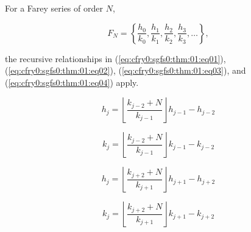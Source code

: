\begin{vworktheoremstatement}
\label{thm:cfry0:sgfs0:01}
For a Farey series of order $N$,

\begin{equation}
F_N = \left\{ { 
\frac{h_0}{k_0},  
\frac{h_1}{k_1},
\frac{h_2}{k_2},
\frac{h_3}{k_3},
\ldots
} \right\} ,
\end{equation}

the recursive relationships in 
(\ref{eq:cfry0:sgfs0:thm:01:eq01}), 
(\ref{eq:cfry0:sgfs0:thm:01:eq02}), 
(\ref{eq:cfry0:sgfs0:thm:01:eq03}), and 
(\ref{eq:cfry0:sgfs0:thm:01:eq04}) apply.

\begin{equation}
\label{eq:cfry0:sgfs0:thm:01:eq01}
h_{j}  = \left\lfloor {\frac{{k_{j-2}
     + N}}{{k_{j - 1} }}} \right\rfloor h_{j - 1}  - h_{j-2}
\end{equation}

\begin{equation}
\label{eq:cfry0:sgfs0:thm:01:eq02}
k_{j}  = \left\lfloor {\frac{{k_{j-2}  + N}}{{k_{j
     - 1} }}} \right\rfloor k_{j - 1}  - k_{j-2}
\end{equation}

\begin{equation}
\label{eq:cfry0:sgfs0:thm:01:eq03}
h_j  = \left\lfloor {\frac{{k_{j + 2}  + N}}{{k_{j + 1} }}} 
\right\rfloor h_{j + 1}  - h_{j + 2}
\end{equation}

\begin{equation}
\label{eq:cfry0:sgfs0:thm:01:eq04}
k_j  = \left\lfloor {\frac{{k_{j + 2}  + N}}{{k_{j + 1} }}} 
\right\rfloor k_{j + 1}  - k_{j + 2}
\end{equation}
\end{vworktheoremstatement}
